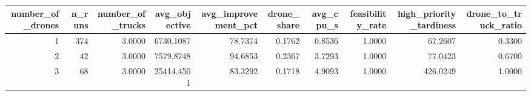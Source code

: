 \begin{tabular}{rrrrrrrrrr}
\toprule
number_of_drones & n_runs & number_of_trucks & avg_objective & avg_improvement_pct & drone_share & avg_cpu_s & feasibility_rate & high_priority_tardiness & drone_to_truck_ratio \\
\midrule
1 & 374 & 3.0000 & 6730.1087 & 78.7374 & 0.1762 & 0.8536 & 1.0000 & 67.2607 & 0.3300 \\
2 & 42 & 3.0000 & 7579.8748 & 94.6853 & 0.2367 & 3.7293 & 1.0000 & 77.0423 & 0.6700 \\
3 & 68 & 3.0000 & 25414.4501 & 83.3292 & 0.1718 & 4.9093 & 1.0000 & 426.0249 & 1.0000 \\
\bottomrule
\end{tabular}
